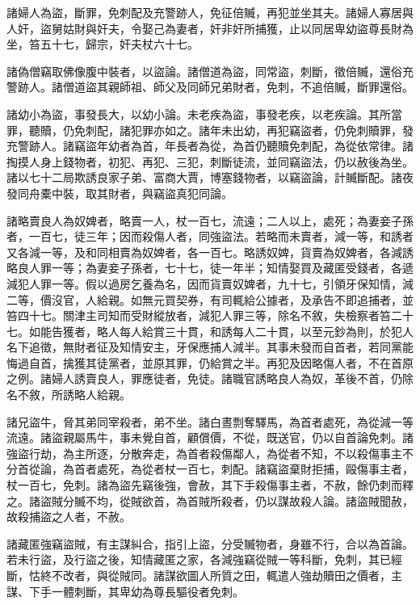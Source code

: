 \begin{pinyinscope}
 諸婦人為盜，斷罪，免刺配及充警跡人，免征倍贓，再犯並坐其夫。諸婦人寡居與人奸，盜舅姑財與奸夫，令娶己為妻者，奸非奸所捕獲，止以同居卑幼盜尊長財為坐，笞五十七，歸宗，奸夫杖六十七。



 諸偽僧竊取佛像腹中裝者，以盜論。諸僧道為盜，同常盜，刺斷，徵倍贓，還俗充警跡人。諸僧道盜其親師祖、師父及同師兄弟財者，免刺，不追倍贓，斷罪還俗。



 諸幼小為盜，事發長大，以幼小論。未老疾為盜，事發老疾，以老疾論。其所當罪，聽贖，仍免刺配，諸犯罪亦如之。諸年未出幼，再犯竊盜者，仍免刺贖罪，發充警跡人。諸竊盜年幼者為首，年長者為從，為首仍聽贖免刺配，為從依常律。諸掏摸人身上錢物者，初犯、再犯、三犯，刺斷徒流，並同竊盜法，仍以赦後為坐。諸以七十二局欺誘良家子弟、富商大賈，博塞錢物者，以竊盜論，計贓斷配。諸夜發同舟橐中裝，取其財者，與竊盜真犯同論。



 諸略賣良人為奴婢者，略賣一人，杖一百七，流遠；二人以上，處死；為妻妾子孫者，一百七，徒三年；因而殺傷人者，同強盜法。若略而未賣者，減一等，和誘者又各減一等，及和同相賣為奴婢者，各一百七。略誘奴婢，貨賣為奴婢者，各減誘略良人罪一等；為妻妾子孫者，七十七，徒一年半；知情娶買及藏匿受錢者，各遞減犯人罪一等。假以過房乞養為名，因而貨賣奴婢者，九十七，引領牙保知情，減二等，價沒官，人給親。如無元買契券，有司輒給公據者，及承告不即追捕者，並笞四十七。關津主司知而受財縱放者，減犯人罪三等，除名不敘，失檢察者笞二十七。如能告獲者，略人每人給賞三十貫，和誘每人二十貫，以至元鈔為則，於犯人名下追徵，無財者征及知情安主，牙保應捕人減半。其事未發而自首者，若同黨能悔過自首，擒獲其徒黨者，並原其罪，仍給賞之半。再犯及因略傷人者，不在首原之例。諸婦人誘賣良人，罪應徒者，免徒。諸職官誘略良人為奴，革後不首，仍除名不敘，所誘略人給親。



 諸兄盜牛，脅其弟同宰殺者，弟不坐。諸白晝剽奪驛馬，為首者處死，為從減一等流遠。諸盜親屬馬牛，事未覺自首，顧償價，不從，既送官，仍以自首論免刺。諸強盜行劫，為主所逐，分散奔走，為首者殺傷鄰人，為從者不知，不以殺傷事主不分首從論，為首者處死，為從者杖一百七，刺配。諸竊盜棄財拒捕，毆傷事主者，杖一百七，免刺。諸為盜先竊後強，會赦，其下手殺傷事主者，不赦，餘仍刺而釋之。諸盜賊分贓不均，從賊欲首，為首賊所殺者，仍以謀故殺人論。諸盜賊聞赦，故殺捕盜之人者，不赦。



 諸藏匿強竊盜賊，有主謀糾合，指引上盜，分受贓物者，身雖不行，合以為首論。若未行盜，及行盜之後，知情藏匿之家，各減強竊從賊一等科斷，免刺，其已經斷，怙終不改者，與從賊同。諸謀欲圖人所質之田，輒遣人強劫贖田之價者，主謀、下手一體刺斷，其卑幼為尊長驅役者免刺。




\end{pinyinscope}
